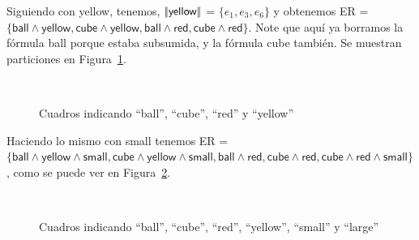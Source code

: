 Siguiendo con \textsf{yellow}, tenemos, $|\!|\textsf{yellow}|\!|$ = $\{e_1, e_3, e_6\}$ y obtenemos ER = $\{\textsf{ball} \wedge \textsf{yellow}, \textsf{cube} \wedge \textsf{yellow}, \textsf{ball} \wedge \textsf{red}, \textsf{cube} \wedge \textsf{red}\}$. 
Note que aqu\'i ya borramos la f\'ormula \textsf{ball} porque estaba subsumida, y la f\'ormula \textsf{cube} tambi\'en. Se muestran particiones en Figura~\ref{fig-modelo10}.

\begin{figure}[ht]
\begin{center}
\\[0pt]
\caption{Cuadros indicando ``ball'', ``cube'', ``red'' y ``yellow''}
\label{fig-modelo10}
\end{center}
\end{figure}

Haciendo lo mismo con \textsf{small} tenemos ER = $\{\textsf{ball} \wedge \textsf{yellow} \wedge \textsf{small}, \textsf{cube} \wedge \textsf{yellow} \wedge \textsf{small}, \textsf{ball} \wedge \textsf{red}, \textsf{cube} \wedge \textsf{red}, \textsf{cube} \wedge \textsf{red} \wedge \textsf{small}\}$, como se puede ver en Figura~\ref{fig-modelo11}.
\begin{figure}[ht]
\begin{center}
\\[0pt]
\caption{Cuadros indicando ``ball'', ``cube'', ``red'', ``yellow'', ``small'' y ``large''}
\label{fig-modelo11}
\end{center}
\end{figure}

